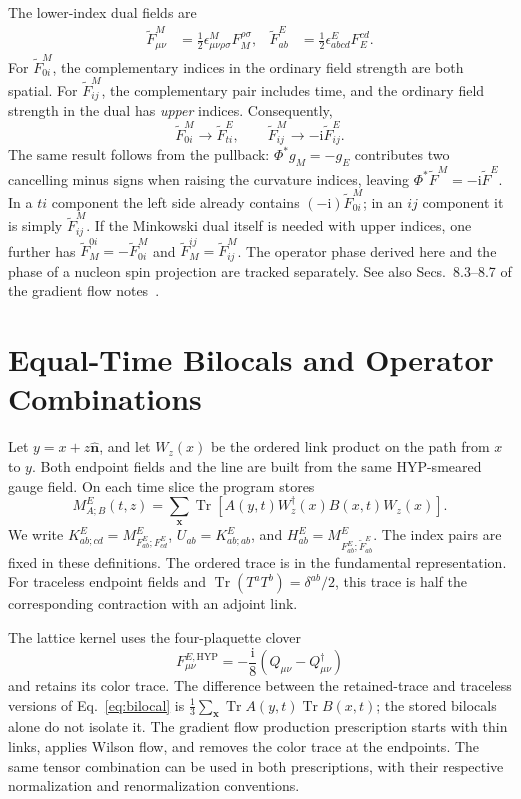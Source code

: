 \documentclass[11pt,a4paper]{article}
\DeclareMathOperator{\Tr}{Tr}
\newcommand{\ii}{\mathrm{i}}
\newcommand{\TE}{\widetilde F^{E}}
\newcommand{\TM}{\widetilde F^{M}}
\begin{document}
The lower-index dual fields are
\begin{align}
 \TM_{\mu\nu}&=\tfrac12\epsilon^M_{\mu\nu\rho\sigma}F_M^{\rho\sigma},&
 \TE_{ab}&=\tfrac12\epsilon^E_{abcd}F_E^{cd}.
 \label{eq:wick-dual-def}
\end{align}
For \(\TM_{0i}\), the complementary indices in the ordinary field strength
are both spatial. For \(\TM_{ij}\), the complementary pair includes time,
and the ordinary field strength in the dual has \emph{upper} indices.
Consequently,
\begin{equation}
 \TM_{0i}\longrightarrow\TE_{ti},\qquad
 \TM_{ij}\longrightarrow-\ii\TE_{ij}.
 \label{eq:wick-dual-components}
\end{equation}
The same result follows from the pullback: \(\Phi^*g_M=-g_E\) contributes two
cancelling minus signs when raising the curvature indices, leaving
\(\Phi^*\TM=-\ii\TE\). In a \(ti\) component the left side already contains
\((-\ii)\TM_{0i}\); in an \(ij\) component it is simply \(\TM_{ij}\). If the
Minkowski dual itself is needed with upper indices, one further has
\(\widetilde F_M^{0i}=-\TM_{0i}\) and \(\widetilde F_M^{ij}=\TM_{ij}\).
The operator phase derived here and the phase of a nucleon spin projection
are tracked separately. See also Secs.~8.3--8.7 of the gradient flow
notes~\cite{FlowNote}.

\section{Equal-Time Bilocals and Operator Combinations}

Let \(y=x+z\hat{\bm n}\), and let \(W_z(x)\) be the ordered link product on
the path from \(x\) to \(y\). Both endpoint fields and the line are built
from the same HYP-smeared gauge field. On each time slice the program stores
\begin{equation}
 M^E_{A;B}(t,z)=\sum_{\bm x}\Tr\!\left[
 A(y,t)W_z^\dagger(x)B(x,t)W_z(x)\right].
 \label{eq:bilocal}
\end{equation}
We write \(K^E_{ab;cd}=M^E_{F^E_{ab};F^E_{cd}}\),
\(U_{ab}=K^E_{ab;ab}\), and
\(H^E_{ab}=M^E_{F^E_{ab};\TE_{ab}}\). The index pairs are fixed in these
definitions. The ordered trace is in the fundamental representation.
For traceless endpoint fields and \(\Tr(T^aT^b)=\delta^{ab}/2\), this trace
is half the corresponding contraction with an adjoint link.

The lattice kernel uses the four-plaquette clover
\begin{equation}
 F^{E,\mathrm{HYP}}_{\mu\nu}=-\frac{\ii}{8}(Q_{\mu\nu}-Q_{\mu\nu}^\dagger)
 \label{eq:clover}
\end{equation}
and retains its color trace. The difference between the retained-trace and
traceless versions of Eq.~\eqref{eq:bilocal} is
\(\tfrac13\sum_{\bm x}\Tr A(y,t)\Tr B(x,t)\); the stored bilocals alone do not
isolate it. The gradient flow production prescription starts with thin
links, applies Wilson flow, and removes the color trace at the endpoints.
The same tensor combination can be used in both prescriptions, with their
respective normalization and renormalization conventions.
\end{document}
